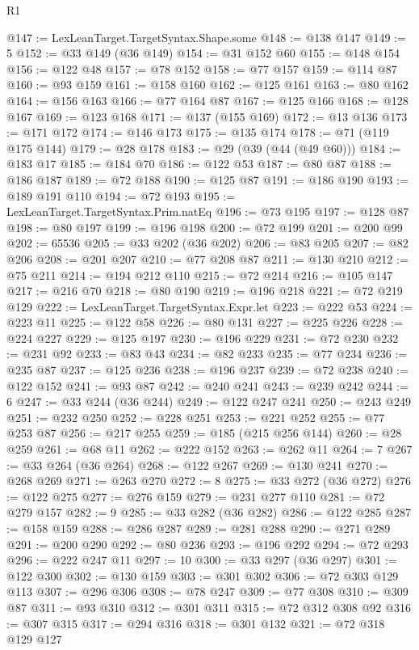 \begin{lexlean}{R1}
\begin{coremodule}
@147 := LexLeanTarget.TargetSyntax.Shape.some
@148 := @138 @147
@149 := 5
@152 := @33 @149 (@36 @149)
@154 := @31 @152 @60
@155 := @148 @154
@156 := @122 @48
@157 := @78 @152
@158 := @77 @157
@159 := @114 @87
@160 := @93 @159
@161 := @158 @160
@162 := @125 @161
@163 := @80 @162
@164 := @156 @163
@166 := @77 @164 @87
@167 := @125 @166
@168 := @128 @167
@169 := @123 @168
@171 := @137 (@155 @169)
@172 := @13 @136
@173 := @171 @172
@174 := @146 @173
@175 := @135 @174
@178 := @71 (@119 @175 @144)
@179 := @28 @178
@183 := @29 (@39 (@44 (@49 @60)))
@184 := @183 @17
@185 := @184 @70
@186 := @122 @53
@187 := @80 @87
@188 := @186 @187
@189 := @72 @188
@190 := @125 @87
@191 := @186 @190
@193 := @189 @191 @110
@194 := @72 @193
@195 := LexLeanTarget.TargetSyntax.Prim.natEq
@196 := @73 @195
@197 := @128 @87
@198 := @80 @197
@199 := @196 @198
@200 := @72 @199
@201 := @200 @99
@202 := 65536
@205 := @33 @202 (@36 @202)
@206 := @83 @205
@207 := @82 @206
@208 := @201 @207
@210 := @77 @208 @87
@211 := @130 @210
@212 := @75 @211
@214 := @194 @212 @110
@215 := @72 @214
@216 := @105 @147
@217 := @216 @70
@218 := @80 @190
@219 := @196 @218
@221 := @72 @219 @129
@222 := LexLeanTarget.TargetSyntax.Expr.let
@223 := @222 @53
@224 := @223 @11
@225 := @122 @58
@226 := @80 @131
@227 := @225 @226
@228 := @224 @227
@229 := @125 @197
@230 := @196 @229
@231 := @72 @230
@232 := @231 @92
@233 := @83 @43
@234 := @82 @233
@235 := @77 @234
@236 := @235 @87
@237 := @125 @236
@238 := @196 @237
@239 := @72 @238
@240 := @122 @152
@241 := @93 @87
@242 := @240 @241
@243 := @239 @242
@244 := 6
@247 := @33 @244 (@36 @244)
@249 := @122 @247 @241
@250 := @243 @249
@251 := @232 @250
@252 := @228 @251
@253 := @221 @252
@255 := @77 @253 @87
@256 := @217 @255
@259 := @185 (@215 @256 @144)
@260 := @28 @259
@261 := @68 @11
@262 := @222 @152
@263 := @262 @11
@264 := 7
@267 := @33 @264 (@36 @264)
@268 := @122 @267
@269 := @130 @241
@270 := @268 @269
@271 := @263 @270
@272 := 8
@275 := @33 @272 (@36 @272)
@276 := @122 @275
@277 := @276 @159
@279 := @231 @277 @110
@281 := @72 @279 @157
@282 := 9
@285 := @33 @282 (@36 @282)
@286 := @122 @285
@287 := @158 @159
@288 := @286 @287
@289 := @281 @288
@290 := @271 @289
@291 := @200 @290
@292 := @80 @236
@293 := @196 @292
@294 := @72 @293
@296 := @222 @247 @11
@297 := 10
@300 := @33 @297 (@36 @297)
@301 := @122 @300
@302 := @130 @159
@303 := @301 @302
@306 := @72 @303 @129 @113
@307 := @296 @306
@308 := @78 @247
@309 := @77 @308
@310 := @309 @87
@311 := @93 @310
@312 := @301 @311
@315 := @72 @312 @308 @92
@316 := @307 @315
@317 := @294 @316
@318 := @301 @132
@321 := @72 @318 @129 @127

\end{coremodule}
\end{lexlean}
